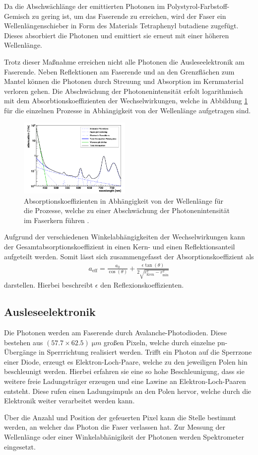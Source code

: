 Da die Abschwächlänge der emittierten Photonen im Polystyrol-Farbstoff-Gemisch zu gering ist, um das Faserende zu erreichen, wird der Faser ein Wellenlängenschieber in Form des Materials Tetraphenyl butadiene zugefügt. Dieses absorbiert die Photonen und emittiert sie erneut mit einer höheren Wellenlänge.

Trotz dieser Maßnahme erreichen nicht alle Photonen die Ausleseelektronik am Faserende. Neben Reflektionen am Faserende und an den Grenzflächen zum Mantel können die Photonen durch Streuung und Absorption im Kernmaterial verloren gehen. Die Abschwächung der Photonenintensität erfolt logarithmisch mit dem Absorbtionskoeffizienten der Wechselwirkungen, welche in Abbildung \ref{fig:ww} für die einzelnen Prozesse in Abhängigkeit von der Wellenlänge aufgetragen sind.\\
\begin{figure}
    \includegraphics[width=0.48\textwidth]{plots/Absorption.png}
    \caption{Absorptionskoeffizienten in Abhängigkeit von der Wellenlänge für die Prozesse, welche zu einer Abschwächung der Photonenintensität im Faserkern führen \cite{anleitung}.}
    \label{fig:ww}
  \end{figure}
  \FloatBarrier
Aufgrund der verschiedenen Winkelabhängigkeiten der Wechselwirkungen kann der Gesamtabsorptionskoeffizient in einen Kern- und einen Reflektionsanteil aufgeteilt werden. Somit lässt sich zusammengefasst der Absorptionskoeffizient als
\begin{align}
    a_{\mathrm{eff}} = \frac{a_0}{\cos(\theta)} + \frac{\epsilon \tan(\theta)}{2 \sqrt{r_{\mathrm{Kern}}^2 - r_{\mathrm{min}}^2}}
    \label{eq:9}
\end{align}
darstellen. Hierbei beschreibt $\epsilon$ den Reflexionskoeffizienten.

\subsection{Ausleseelektronik}
Die Photonen werden am Faserende durch Avalanche-Photodioden. Diese bestehen aus $(57.7 \times 62.5)\;\si{\micro m}$ großen Pixeln, welche durch einzelne pn-Übergänge in Sperrrichtung realisiert werden. Trifft ein Photon auf die Sperrzone einer Diode, erzeugt es Elektron-Loch-Paare, welche zu den jeweiligen Polen hin beschleunigt werden. Hierbei erfahren sie eine so hohe Beschleunigung, dass sie weitere freie Ladungsträger erzeugen und eine Lawine an Elektron-Loch-Paaren entsteht. Diese rufen einen Ladungsimpuls an den Polen hervor, welche durch die Elektronik weiter verarbeitet werden kann.

Über die Anzahl und Position der gefeuerten Pixel kann die Stelle bestimmt werden, an welcher das Photon die Faser verlassen hat. Zur Messung der Wellenlänge oder einer Winkelabhänigikeit der Photonen werden Spektrometer eingesetzt.
